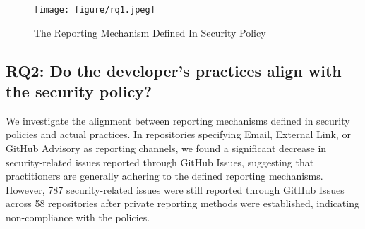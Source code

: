 

\begin{figure}[!]
    \centering
    \texttt{[image: figure/rq1.jpeg]}
    \caption{The Reporting Mechanism Defined In Security Policy}
    \label{fig:rq1}
    \vspace*{-.5cm}
\end{figure}


\subsection{RQ2: Do the developer's practices align with the security policy?}

We investigate the alignment between reporting mechanisms defined in security policies and actual practices. In repositories specifying Email, External Link, or GitHub Advisory as reporting channels, we found a significant decrease in security-related issues reported through GitHub Issues, suggesting that practitioners are generally adhering to the defined reporting mechanisms. However, 787 security-related issues were still reported through GitHub Issues across 58 repositories after private reporting methods were established, indicating non-compliance with the policies. 


